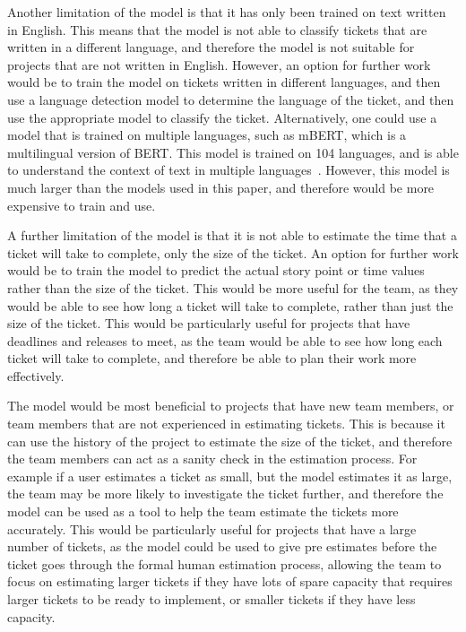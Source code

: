 \documentclass{UoYCSproject}
\begin{document}
    Another limitation of the model is that it has only been trained on text written in English. This means that the model is not able to classify tickets that are written in a different language, and therefore the model is not suitable for projects that are not written in English.
    However, an option for further work would be to train the model on tickets written in different languages, and then use a language detection model to determine the language of the ticket, and then use the appropriate model to classify the ticket. Alternatively, one could use a model that is trained on multiple languages, such as mBERT, which is a multilingual version of BERT. This model is trained on 104 languages, and is able to understand the context of text in multiple languages~\cite{devlin2018bert}. However, this model is much larger than the models used in this paper, and therefore would be more expensive to train and use.

    A further limitation of the model is that it is not able to estimate the time that a ticket will take to complete, only the size of the ticket. An option for further work would be to train the model to predict the actual story point or time values rather than the size of the ticket. This would be more useful for the team, as they would be able to see how long a ticket will take to complete, rather than just the size of the ticket. This would be particularly useful for projects that have deadlines and releases to meet, as the team would be able to see how long each ticket will take to complete, and therefore be able to plan their work more effectively.

    The model would be most beneficial to projects that have new team members, or team members that are not experienced in estimating tickets. This is because it can use the history of the project to estimate the size of the ticket, and therefore the team members can act as a sanity check in the estimation process. For example if a user estimates a ticket as small, but the model estimates it as large, the team may be more likely to investigate the ticket further, and therefore the model can be used as a tool to help the team estimate the tickets more accurately. This would be particularly useful for projects that have a large number of tickets, as the model could be used to give pre estimates before the ticket goes through the formal human estimation process, allowing the team to focus on estimating larger tickets if they have lots of spare capacity that requires larger tickets to be ready to implement, or smaller tickets if they have less capacity.










\printbibliography
\end{document}
